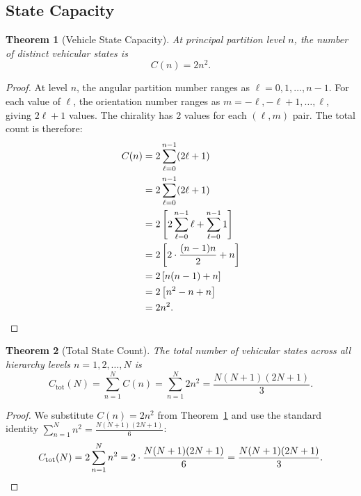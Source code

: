 \documentclass[twocolumn,10pt]{article}
\newtheorem{theorem}{Theorem}[section]
\newcommand{\Ctot}{C_{\mathrm{tot}}}
\begin{document}
\subsection{State Capacity}

\begin{theorem}[Vehicle State Capacity]\label{thm:capacity}
At principal partition level $n$, the number of distinct vehicular states is
\begin{equation}\label{eq:capacity}
C(n) = 2n^2.
\end{equation}
\end{theorem}

\begin{proof}
At level $n$, the angular partition number ranges as $\ell = 0, 1, \ldots, n-1$. For each value of $\ell$, the orientation number ranges as $m = -\ell, -\ell+1, \ldots, \ell$, giving $2\ell + 1$ values. The chirality has 2 values for each $(\ell, m)$ pair. The total count is therefore:
\begin{align}
C(n) &= 2 \sum_{\ell=0}^{n-1} (2\ell + 1) \nonumber\\
&= 2 \sum_{\ell=0}^{n-1} (2\ell + 1) \nonumber\\
&= 2 \left[ 2\sum_{\ell=0}^{n-1} \ell + \sum_{\ell=0}^{n-1} 1 \right] \nonumber\\
&= 2 \left[ 2 \cdot \frac{(n-1)n}{2} + n \right] \nonumber\\
&= 2 \left[ n(n-1) + n \right] \nonumber\\
&= 2 \left[ n^2 - n + n \right] \nonumber\\
&= 2n^2. \qedhere
\end{align}
\end{proof}

\begin{theorem}[Total State Count]\label{thm:totalstates}
The total number of vehicular states across all hierarchy levels $n = 1, 2, \ldots, N$ is
\begin{equation}\label{eq:totalstates}
\Ctot(N) = \sum_{n=1}^{N} C(n) = \sum_{n=1}^{N} 2n^2 = \frac{N(N+1)(2N+1)}{3}.
\end{equation}
\end{theorem}

\begin{proof}
We substitute $C(n) = 2n^2$ from Theorem~\ref{thm:capacity} and use the standard identity $\sum_{n=1}^{N} n^2 = \frac{N(N+1)(2N+1)}{6}$:
\begin{equation}
\Ctot(N) = 2 \sum_{n=1}^{N} n^2 = 2 \cdot \frac{N(N+1)(2N+1)}{6} = \frac{N(N+1)(2N+1)}{3}. \qedhere
\end{equation}
\end{proof}
\end{document}
